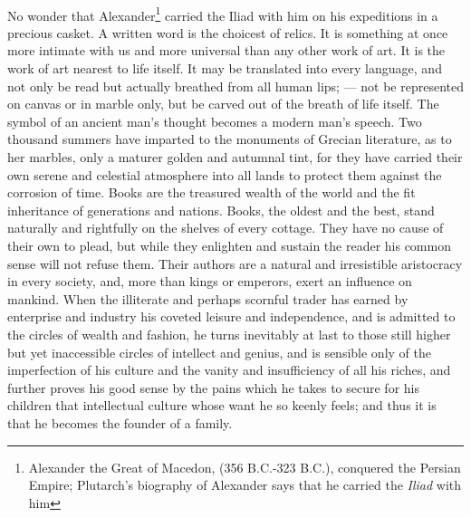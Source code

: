 \documentclass[letterpaper,12pt]{article}
\begin{document}
\paragraph{}
No wonder that Alexander\footnote{Alexander the Great of Macedon, (356 B.C.-323
    B.C.), conquered the Persian Empire; Plutarch's biography of Alexander says
    that he carried the \textit{Iliad} with him} carried the Iliad with him on
his expeditions in a precious casket. A written word is the choicest of relics.
It is something at once more intimate with us and more universal than any other
work of art. It is the work of art nearest to life itself. It may be translated
into every language, and not only be read but actually breathed from all human
lips; --- not be represented on canvas or in marble only, but be carved out of
the breath of life itself. The symbol of an ancient man's thought becomes a
modern man's speech. Two thousand summers have imparted to the monuments of
Grecian literature, as to her marbles, only a maturer golden and autumnal tint,
for they have carried their own serene and celestial atmosphere into all lands
to protect them against the corrosion of time. Books are the treasured wealth of
the world and the fit inheritance of generations and nations. Books, the oldest
and the best, stand naturally and rightfully on the shelves of every cottage.
They have no cause of their own to plead, but while they enlighten and sustain
the reader his common sense will not refuse them. Their authors are a natural
and irresistible aristocracy in every society, and, more than kings or emperors,
exert an influence on mankind. When the illiterate and perhaps scornful trader
has earned by enterprise and industry his coveted leisure and independence, and
is admitted to the circles of wealth and fashion, he turns inevitably at last to
those still higher but yet inaccessible circles of intellect and genius, and is
sensible only of the imperfection of his culture and the vanity and
insufficiency of all his riches, and further proves his good sense by the pains
which he takes to secure for his children that intellectual culture whose want
he so keenly feels; and thus it is that he becomes the founder of a family.
\end{document}
